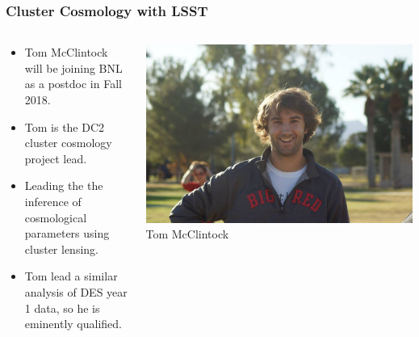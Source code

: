 \documentclass[aspectratio=169]{beamer}
\begin{document}
\frame
{

    \frametitle{Cluster Cosmology with LSST}


    \begin{columns}
        \begin{column}{0.5\textwidth}

            \begin{itemize}

                \item Tom McClintock will be joining BNL as a postdoc
                    in Fall 2018.

                \item Tom is the DC2 cluster cosmology project lead.

                \item Leading the the inference of cosmological parameters
                    using cluster lensing.

                \item Tom lead a similar analysis of DES year 1 data, so
                    he is eminently qualified.

            \end{itemize}
        \end{column}

        \begin{column}{0.5\textwidth}
            \begin{center}
                \includegraphics[width=\textwidth]{TomMportrait.jpg}
                \newline
                {\tiny Tom McClintock}
            \end{center}
        \end{column}

    \end{columns}


}
\end{document}
